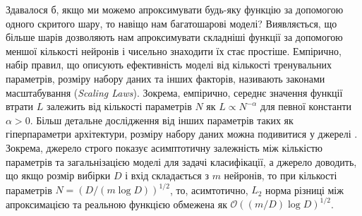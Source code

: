 Здавалося б, якщо ми можемо апроксимувати будь-яку функцію за допомогою одного
скритого шару, то навіщо нам багатошарові моделі? Виявляється, що більше шарів
дозволяють нам апроксимувати складніші функції за допомогою меншої кількості
нейронів і чисельно знаходити їх стає простіше. Емпірично, набір правил, що
описують ефективність моделі від кількості тренувальних параметрів, розміру
набору даних та інших факторів, називають законами масштабування
(\textit{Scaling Laws}). Зокрема, емпірично, середнє значення функції втрати $L$
залежить від кількості параметрів $N$ як $L \propto N^{-\alpha}$ для певної
константи $\alpha>0$. Більш детальне дослідження від інших параметрів таких як
гіперпараметри архітектури, розміру набору даних можна подивитися у джерелі
\cite{scaling}. Зокрема, джерело \cite{params-generalization} строго показує
асимптотичну залежність між кількістю параметрів та загальнізацією моделі для
задачі класифікації, а джерело \cite{params-generalization-2} доводить, що якщо
розмір вибірки $D$ і вхід складається з $m$ нейронів, то при кількості
параметрів $N=(D/(m\log D))^{1/2}$, то, асимтотично, $L_2$ норма різниці між
апроксимацією та реальною функцією обмежена як $\mathcal{O}((m/D)\log D)^{1/2}$.

